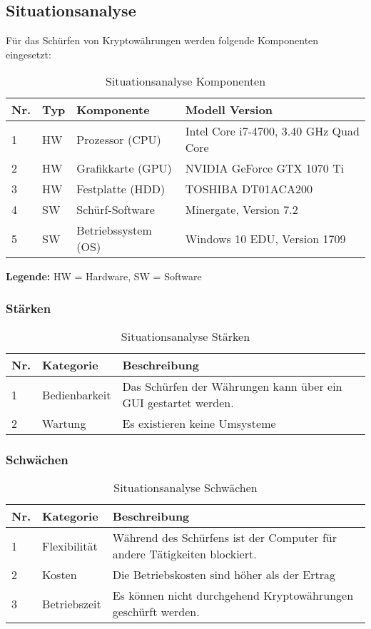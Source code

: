 \subsection{Situationsanalyse}
Für das Schürfen von Kryptowährungen werden folgende Komponenten eingesetzt:
\begin{table}[H]
\begin{tabular}[t]{p{0.5cm}p{0.8cm}p{6.7cm}p{6.7cm}}
\hline
\rowcolor{heading}\textbf{Nr.} & \textbf{Typ} & \textbf{Komponente} & \textbf{Modell \/Version} \\\hline
1 & HW & Prozessor (CPU) & Intel Core i7-4700, 3.40 GHz Quad Core \\\hline
2 & HW & Grafikkarte (GPU) & NVIDIA GeForce GTX 1070 Ti  \\\hline
3 & HW & Festplatte (HDD) & TOSHIBA DT01ACA200  \\\hline
4 & SW & Schürf-Software & Minergate, Version 7.2  \\\hline
5 & SW & Betriebssystem (OS) & Windows 10 EDU, Version 1709 \\\hline
\end{tabular}
\caption{Situationsanalyse Komponenten}
\end{table}


\textbf{Legende:} HW = Hardware, SW = Software

\subsubsection{Stärken}
\begin{table}[H]
\begin{tabular}[t]{p{0.5cm}p{4.1cm}p{10.1cm}}
\hline
\rowcolor{heading}\textbf{Nr.} & \textbf{Kategorie} & \textbf{Beschreibung} \\\hline
1 & Bedienbarkeit & Das Schürfen der Währungen kann über ein GUI gestartet werden. \\\hline
2 & Wartung & Es existieren keine Umsysteme  \\\hline
\end{tabular}
\caption{Situationsanalyse Stärken}
\end{table}

\subsubsection{Schwächen}
\begin{table}[H]
\begin{tabular}[t]{p{0.5cm}p{4.1cm}p{10.1cm}}
\hline
\rowcolor{heading}\textbf{Nr.} & \textbf{Kategorie} & \textbf{Beschreibung} \\\hline
1 & Flexibilität & Während des Schürfens ist der Computer für andere Tätigkeiten blockiert. \\\hline
2 & Kosten & Die Betriebskosten sind höher als der Ertrag  \\\hline
3 & Betriebszeit & Es können nicht durchgehend Kryptowährungen geschürft werden.  \\\hline
\end{tabular}
\caption{Situationsanalyse Schwächen}
\end{table}
